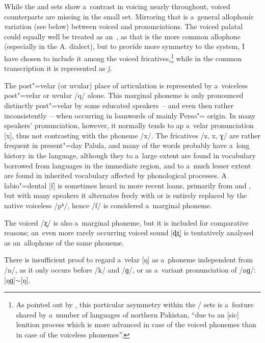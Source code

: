 While the  and  sets show a~contrast in voicing nearly throughout, voiced counterparts are missing in the small  set. Mirroring that is a~general allophonic variation (see below) between voiced  and  pronunciations. The voiced palatal  could equally well be treated as an~, as that is the more common allophone (especially in the A. dialect), but to provide more symmetry to the system, I have chosen to include it among the voiced fricatives,\footnote{As pointed out by \citet[34]{zoller2005}, this particular asymmetry within the / sets is a~feature shared by a~number of languages of northern Pakistan, ``due to an [sic] lenition process which is more advanced in case of the voiced phonemes than in case of the voiceless phonemes''.} while in the common transcription it is represented as \textit{ǰ}.


The post"=velar (or uvular) place of articulation is represented by a~voiceless post"=velar or uvular  /q/ alone. This marginal phoneme is only pronounced distinctly post"=velar by some educated speakers~-- and even then rather inconsistently~-- when occurring in loanwords of mainly Perso"= origin. In many speakers' pronunciation, however, it normally tends to ap a~velar  pronunciation [x], thus not contrasting with the phoneme /x/. The fricatives /z, x, ɣ/ are rather frequent in present"=day Palula, and many of the words probably have a~long history in the language, although they to a~large extent are found in vocabulary borrowed from languages in the immediate region, and to a~much lesser extent are found in inherited vocabulary affected by phonological processes. A labio"=dental [f] is sometimes heard in more recent loans, primarily from  and , but with many speakers it alternates freely with or is entirely replaced by the native voiceless  /pʰ/, hence /f/ is considered a~marginal phoneme. 


The voiced   /ʐ/ is also a~marginal phoneme, but it is included for comparative reasons; an~even more rarely occurring voiced   sound [ɖʐ] is tentatively analysed as an~allophone of the same phoneme. 


There is insufficient proof to regard a~velar  [ŋ] as a~phoneme independent from /n/, as it only occurs before /k/ and /ɡ/, or as a~variant pronunciation of /nɡ/: [ŋɡ]$\sim$[ŋ]. 


